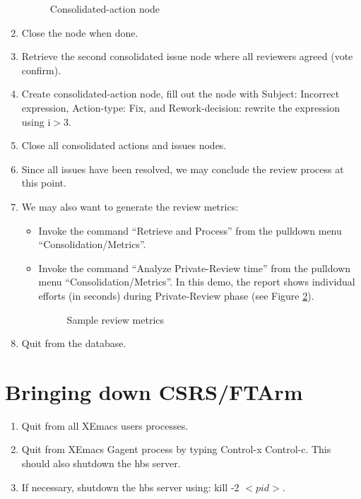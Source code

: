 \begin{enumerate}
\begin{figure}[htb]
  {\centerline{}}
  \caption{Consolidated-action node}
  \label{consolidated-action}
\end{figure}

\item Close the node when done.
\item Retrieve the second consolidated issue node where all reviewers
agreed (vote confirm).
\item Create consolidated-action node, fill out the node with Subject:
Incorrect expression, Action-type: Fix, and Rework-decision: rewrite the
expression using i$>$3.
\item Close all consolidated actions and issues nodes.
\item Since all issues have been resolved, we may conclude the review
process at this point. 
\item We may also want to generate the review metrics:
  \begin{itemize}
   \item Invoke the command ``Retrieve and Process'' from 
    the pulldown menu ``Consolidation/Metrics''.
   \item Invoke the command ``Analyze Private-Review time'' from
    the pulldown menu ``Consolidation/Metrics''.
    In this demo, the report shows individual efforts (in seconds)
    during  Private-Review phase (see Figure \ref{metrics}). 
\begin{figure}[htb]
  {\centerline{}}
  \caption{Sample review metrics}
  \label{metrics}
\end{figure}

  \end{itemize}
\item Quit from the database.
\end{enumerate}

\section{Bringing down CSRS/FTArm}

\begin{enumerate}
\item Quit from all XEmacs users processes.
\item Quit from XEmacs Gagent process by typing Control-x Control-c.
This should also shutdown the hbs server.
\item If necessary, shutdown the hbs server using: kill -2 $<pid>$.
\end{enumerate}







